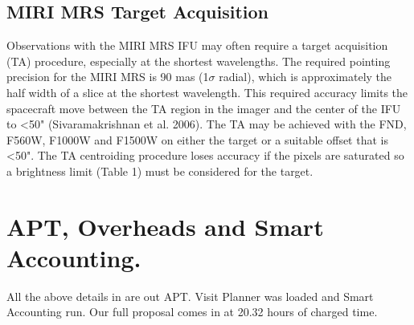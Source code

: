 \subsection*{MIRI MRS Target Acquisition}
Observations with the MIRI MRS IFU may often require a target
acquisition (TA) procedure, especially at the shortest
wavelengths. The required pointing precision for the MIRI MRS is 90
mas (1$\sigma$ radial), which is approximately the half width of a
slice at the shortest wavelength. This required accuracy limits the
spacecraft move between the TA region in the imager and the center of
the IFU to <50" (Sivaramakrishnan et al. 2006).  The TA may be
achieved with the FND, F560W, F1000W and F1500W on either the target
or a suitable offset that is <50". The TA centroiding procedure loses
accuracy if the pixels are saturated so a brightness limit (Table 1)
must be considered for the target.

\section*{APT, Overheads and Smart Accounting.}
All the above details in are out APT. 
Visit Planner was loaded and Smart Accounting run. 
Our full proposal comes in at 20.32 hours of charged time. 